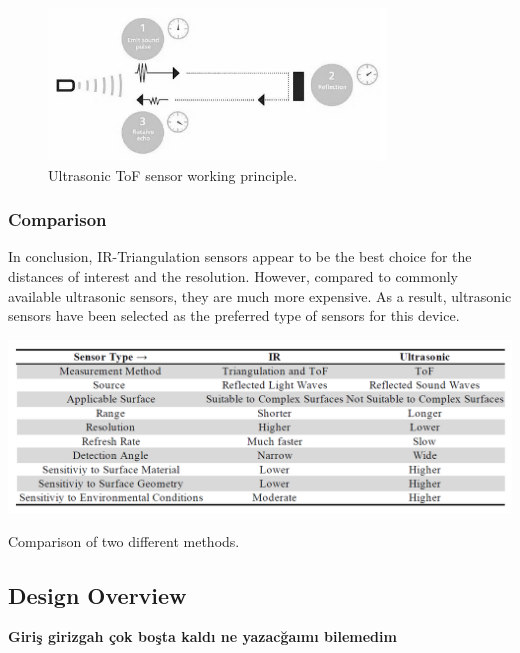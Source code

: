 \documentclass[12pt, a4paper]{article}
\begin{document}
                \begin{figure}[H]\centering
                    \includegraphics[width=0.8\textwidth]{ultrasonic.png}
                    \caption[]{Ultrasonic ToF sensor working principle.}\label{fig:ultrasonic}
                \end{figure}




        \subsubsection{Comparison}
            In conclusion, IR-Triangulation sensors appear to be the best choice for the distances of interest and the resolution. However, compared to commonly available ultrasonic sensors, they are much more expensive. As a result, ultrasonic sensors have been selected as the preferred type of sensors for this device.

            \begin{table}[H]\centering
                \includegraphics[width=\textwidth]{comparison.png}
                \caption[]{Comparison of two different methods.}\label{tab:comparison}
            \end{table}


    \pagebreak
    \subsection{Design Overview}
        
        \textbf{Giriş girizgah çok boşta kaldı ne yazacğaımı bilemedim}
\end{document}
